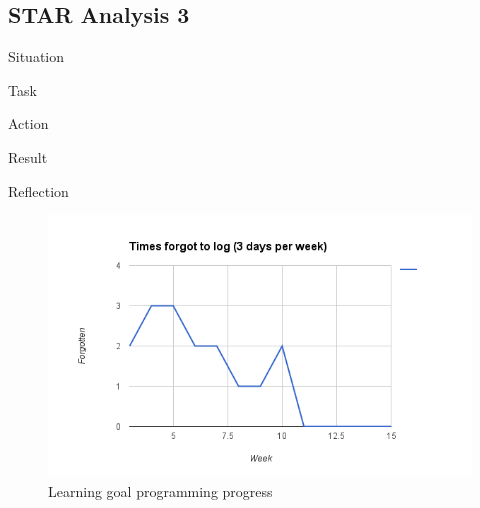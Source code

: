 \documentclass[12pt]{article}
\begin{document}
	\subsection{STAR Analysis 3}
	\begin{STAR}
	    \item[Situation]
	    \item[Task]
	    \item[Action]
	    \item[Result]
	    \item[Reflection]
	\end{STAR}
	
	\begin{figure}[ht]
		\centering
		\includegraphics[width=\textwidth, keepaspectratio=true]{personaldossiers/LearningGoalLoggingMartijn.png}
		\caption{Learning goal programming progress}\label{lglogging}
	\end{figure}
	
	
	
	
\end{document}
